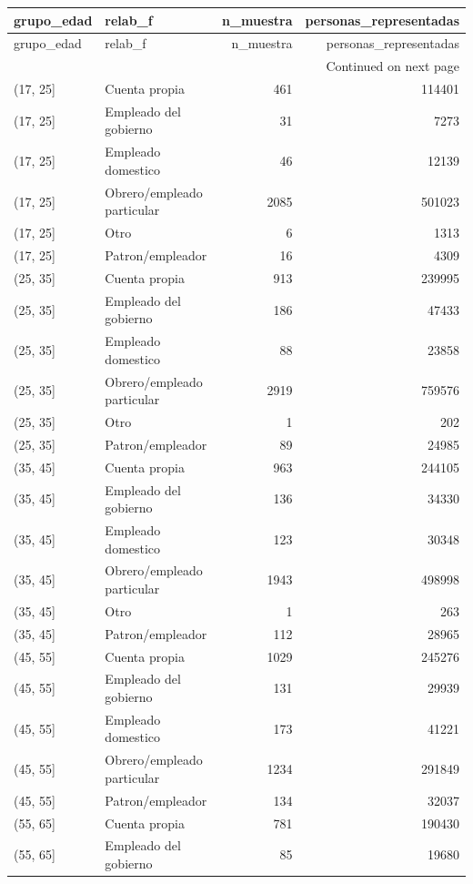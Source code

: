 \begin{longtable}{llrr}
\toprule
grupo\_edad & relab\_f & n\_muestra & personas\_representadas \\
\midrule
\endfirsthead
\toprule
grupo\_edad & relab\_f & n\_muestra & personas\_representadas \\
\midrule
\endhead
\midrule
\multicolumn{4}{r}{Continued on next page} \\
\midrule
\endfoot
\bottomrule
\endlastfoot
(17, 25] & Cuenta propia & 461 & 114401 \\
(17, 25] & Empleado del gobierno & 31 & 7273 \\
(17, 25] & Empleado domestico & 46 & 12139 \\
(17, 25] & Obrero/empleado particular & 2085 & 501023 \\
(17, 25] & Otro & 6 & 1313 \\
(17, 25] & Patron/empleador & 16 & 4309 \\
(25, 35] & Cuenta propia & 913 & 239995 \\
(25, 35] & Empleado del gobierno & 186 & 47433 \\
(25, 35] & Empleado domestico & 88 & 23858 \\
(25, 35] & Obrero/empleado particular & 2919 & 759576 \\
(25, 35] & Otro & 1 & 202 \\
(25, 35] & Patron/empleador & 89 & 24985 \\
(35, 45] & Cuenta propia & 963 & 244105 \\
(35, 45] & Empleado del gobierno & 136 & 34330 \\
(35, 45] & Empleado domestico & 123 & 30348 \\
(35, 45] & Obrero/empleado particular & 1943 & 498998 \\
(35, 45] & Otro & 1 & 263 \\
(35, 45] & Patron/empleador & 112 & 28965 \\
(45, 55] & Cuenta propia & 1029 & 245276 \\
(45, 55] & Empleado del gobierno & 131 & 29939 \\
(45, 55] & Empleado domestico & 173 & 41221 \\
(45, 55] & Obrero/empleado particular & 1234 & 291849 \\
(45, 55] & Patron/empleador & 134 & 32037 \\
(55, 65] & Cuenta propia & 781 & 190430 \\
(55, 65] & Empleado del gobierno & 85 & 19680 \\

\end{longtable}
